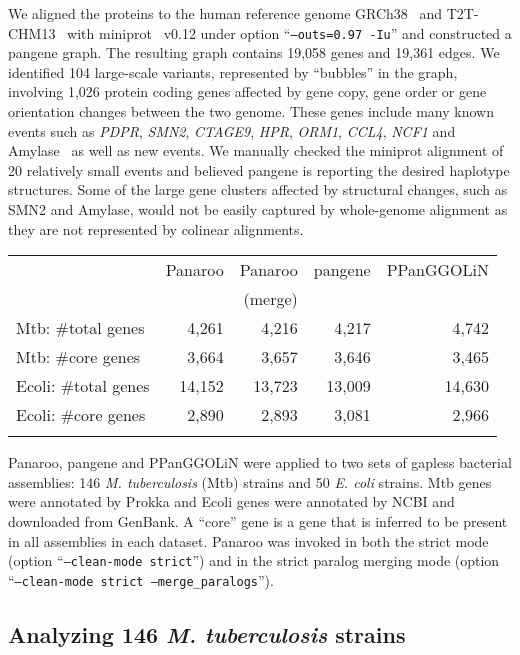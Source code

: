 \documentclass{bioinfo}
\begin{document}
We aligned the proteins to the human reference genome GRCh38~\citep{Schneider:2017aa} and T2T-CHM13~\citep{Nurk:2022up}
with miniprot~\citep{Li:2023ac} v0.12 under option ``{\tt --outs=0.97 -Iu}''
and constructed a pangene graph.
The resulting graph contains 19,058 genes and 19,361 edges.
We identified 104 large-scale variants, represented by ``bubbles'' in the graph,
involving 1,026 protein coding genes affected by gene copy, gene order or gene orientation changes between the two genome.
These genes include many known events such as {\it PDPR}, {\it SMN2}, {\it CTAGE9}, {\it HPR}, {\it ORM1}, {\it CCL4}, {\it NCF1} and Amylase~\citep{Handsaker:2015ur,Sudmant:2010aa}
as well as new events.
We manually checked the miniprot alignment of 20 relatively small events
and believed pangene is reporting the desired haplotype structures.
Some of the large gene clusters affected by structural changes, such as SMN2 and Amylase,
would not be easily captured by whole-genome alignment as they are not represented by colinear alignments.


\begin{table}[!tb]
{\footnotesize\label{tab:bac}
\begin{tabular}{p{2.3cm}rrrr}
\toprule
& Panaroo & Panaroo & pangene & PPanGGOLiN\\
&         & (merge) \\
\midrule
Mtb: \#total genes   & 4,261  & 4,216  & 4,217  & 4,742  \\
Mtb: \#core genes    & 3,664  & 3,657  & 3,646  & 3,465  \\
Ecoli: \#total genes & 14,152 & 13,723 & 13,009 & 14,630 \\
Ecoli: \#core genes  & 2,890  & 2,893  & 3,081  & 2,966  \\
\botrule
\end{tabular}
}{Panaroo, pangene and PPanGGOLiN were applied to two sets of gapless bacterial assemblies:
146 \emph{M. tuberculosis} (Mtb) strains and 50 \emph{E. coli} strains.
Mtb genes were annotated by Prokka and Ecoli genes were annotated by NCBI and downloaded from GenBank.
A ``core'' gene is a gene that is inferred to be present in all assemblies in each dataset.
Panaroo was invoked in both the strict mode (option ``{\tt --clean-mode strict}'')
and in the strict paralog merging mode (option ``{\tt --clean-mode strict --merge\_paralogs}'').}
\end{table}

\subsection*{Analyzing 146 \emph{M. tuberculosis} strains}
\end{document}
